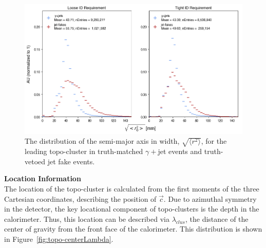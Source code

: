 \begin{figure}[!htbp]
    \centering 
    \includegraphics[width=\textwidth]{chapters/chapter4_photonID/images/hists/y_topoCluster0_secondR.png}
    \caption[The distribution of the semi-major axis in width, $\sqrt{\langle r^2 \rangle}$, for the leading topo-cluster]{The distribution of the semi-major axis in width, $\sqrt{\langle r^2 \rangle}$, for the leading topo-cluster in truth-matched $\gamma+$jet events and truth-vetoed jet fake events.}
    \label{fig:topo-secondR}
\end{figure}




\noindent\textbf{Location Information}\\
\indent The location of the topo-cluster is calculated from the first moments of the three Cartesian coordinates, describing the position of $\vec{c}$. Due to azimuthal symmetry in the detector, the key locational component of topo-clusters is the depth in the calorimeter. Thus, this location can be described via $\lambda_{clus}$, the distance of the center of gravity from the front face of the calorimeter. This distribution is shown in Figure~\ref{fig:topo-centerLambda}.

